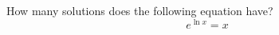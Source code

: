 \documentclass{ximera}
\author{David Kish}
\begin{document}
\begin{exercise}
How many solutions does the following equation have? \\
\[
e^{\ln{x}}=x
\]
\begin{multipleChoice}  
\end{multipleChoice}  
\end{exercise}
\end{document}
